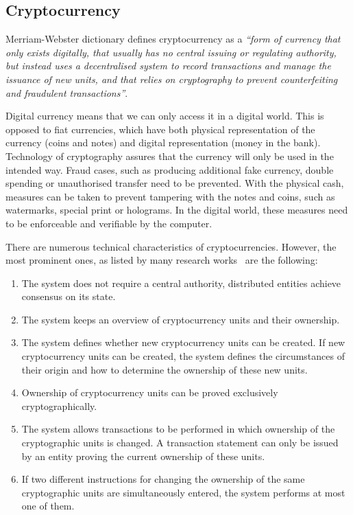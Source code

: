\subsection{Cryptocurrency}
% 
Merriam-Webster dictionary defines cryptocurrency as a \textit{``form of currency that only exists digitally, that usually has no central issuing or regulating authority, but instead uses a decentralised system to record transactions and manage the issuance of new units, and that relies on cryptography to prevent counterfeiting and fraudulent transactions''}\footnotemark.
% 

Digital currency means that we can only access it in a digital world. This is opposed to fiat currencies, which have both physical representation of the currency (coins and notes) and digital representation (money in the bank). Technology of cryptography assures that the currency will only be used in the intended way. Fraud cases, such as producing additional fake currency, double spending or unauthorised transfer need to be prevented. With the physical cash, measures can be taken to prevent tampering with the notes and coins, such as watermarks, special print or holograms. In the digital world, these measures need to be enforceable and verifiable by the computer.

There are numerous technical characteristics of cryptocurrencies. However, the most prominent ones, as listed by many research works~\cite{Lansky2018PossibleCryptocurrencies} are the following:
\begin{enumerate}[noitemsep]
    \item The system does not require a central authority, distributed entities achieve consensus on its state.
    \item The system keeps an overview of cryptocurrency units and their ownership.
    \item The system defines whether new cryptocurrency units can be created. If new cryptocurrency units can  be  created,  the  system  defines  the  circumstances  of  their  origin  and  how  to  determine  the ownership of these new units.
    \item Ownership of cryptocurrency units can be proved exclusively cryptographically.
    \item The system allows transactions to be performed in  which ownership of the cryptographic units is changed. A transaction statement can only be issued by an entity proving the current ownership of these units.
    \item If  two  different  instructions  for  changing  the  ownership  of the  same  cryptographic  units  are simultaneously entered, the system performs at most one of them.
\end{enumerate}

